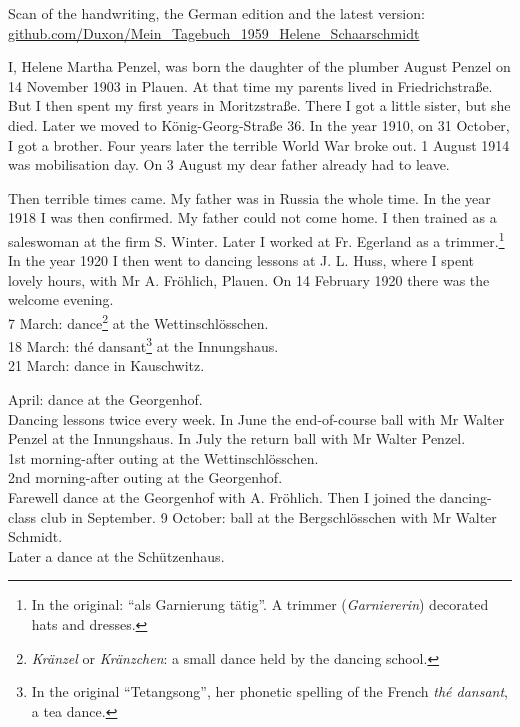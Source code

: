 \documentclass[a5paper,11pt,openany]{book}
\newcommand{\seite}[1]{\leavevmode\marginpar{\footnotesize\itshape\raggedright #1}\ignorespaces}
\begin{document}
\vfill
{\small\noindent Scan of the handwriting, the German edition and the latest version:\\
\href{https://github.com/Duxon/Mein_Tagebuch_1959_Helene_Schaarschmidt}{github.com/Duxon/\allowbreak Mein\_Tagebuch\_1959\_Helene\_Schaarschmidt}\par}

\mainmatter
\seite{1}
I, Helene Martha Penzel, was born the daughter of the plumber August Penzel on 14 November 1903 in Plauen.
At that time my parents lived in Friedrichstraße.
But I then spent my first years in Moritzstraße.
There I got a little sister, but she died.
Later we moved to König-Georg-Straße 36.
In the year 1910, on 31 October, I got a brother.
Four years later the terrible World War broke out.
1 August 1914 was mobilisation day.
On 3 August my dear father already had to leave.

\seite{2}
Then terrible times came.
My father was in Russia the whole time.
In the year 1918 I was then confirmed.
My father could not come home.
I then trained as a saleswoman at the firm S. Winter.
Later I worked at Fr. Egerland as a trimmer.\footnote{In the original: ``als Garnierung tätig''. A trimmer (\emph{Garniererin}) decorated hats and dresses.}
In the year 1920 I then went to dancing lessons at J. L. Huss, where I spent lovely hours, with Mr A. Fröhlich, Plauen.
On 14 February 1920 there was the welcome evening.\\
7 March: dance\footnote{\emph{Kränzel} or \emph{Kränzchen}: a small dance held by the dancing school.} at the Wettinschlösschen.\\
18 March: thé dansant\footnote{In the original ``Tetangsong'', her phonetic spelling of the French \emph{thé dansant}, a tea dance.} at the Innungshaus.\\
21 March: dance in Kauschwitz.

\seite{3}
18 April: dance at the Georgenhof.\\
Dancing lessons twice every week.
In June the end-of-course ball with Mr Walter Penzel at the Innungshaus.
In July the return ball with Mr Walter Penzel.\\
1st morning-after outing at the Wettinschlösschen.\\
2nd morning-after outing at the Georgenhof.\\
Farewell dance at the Georgenhof with A. Fröhlich.
Then I joined the dancing-class club in September.
9 October: ball at the Bergschlösschen with Mr Walter Schmidt.\\
Later a dance at the Schützenhaus.
\end{document}

